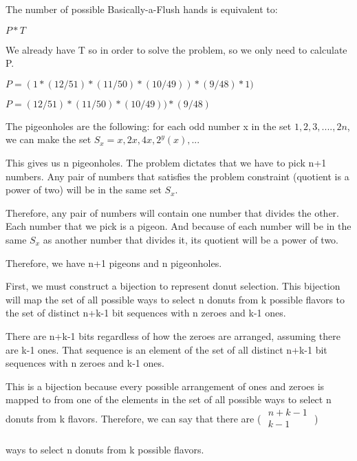 \documentclass{6042}
\begin{document}
The number of possible Basically-a-Flush hands is equivalent to:

$P * T$

We already have T so in order to solve the problem, so we only need to calculate P.

$P = (1 * (12/51) * (11/50) * (10/49)) * (9/48) * 1)$

$P = (12/51) * (11/50) * (10/49)) * (9/48)$



The pigeonholes are the following: for each odd number x in the set ${1, 2, 3,...., 2n}$, we
can make the set $S_x = {x, 2x, 4x, 2^y(x),...}$

This gives us n pigeonholes. The problem dictates that we have to pick n+1 numbers.
Any pair of numbers that satisfies the problem constraint (quotient is a power of two) will be in the same set $S_x$.

Therefore, any pair of numbers will contain one number that divides the other. Each number that we pick is a pigeon. And because of 
each number will be in the same $S_x$ as another number that divides it, its quotient will be a power of two. 

Therefore, we have n+1 pigeons and n pigeonholes.




First, we must construct a bijection to represent donut selection. This bijection will map the set of all possible
ways to select n donuts from k possible flavors to the set of distinct n+k-1 bit sequences with n zeroes and k-1 ones.

There are n+k-1 bits regardless of how the zeroes are arranged, assuming there are k-1 ones. That sequence is an element of the set of all
distinct n+k-1 bit sequences with n zeroes and k-1 ones.

This is a bijection because every possible arrangement of ones and zeroes is mapped to from one of the elements in the set of all possible ways to select
n donuts from k flavors. Therefore, we can say that there are 
(
\(
  {\begin{array}{c}
   n+k-1\\
   k-1\\
  \end{array} }
\)
)

ways to select n donuts from k possible flavors.

\end{document}
